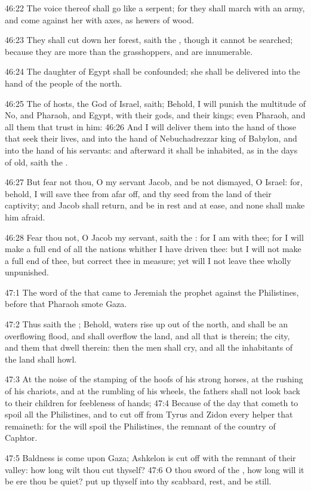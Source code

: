 46:22 The voice thereof shall go like a serpent; for they shall march with an army, and come against her with axes, as hewers of wood.

46:23 They shall cut down her forest, saith the \LORD, though it cannot be searched; because they are more than the grasshoppers, and are innumerable.

46:24 The daughter of Egypt shall be confounded; she shall be delivered into the hand of the people of the north.

46:25 The \LORD of hosts, the God of Israel, saith; Behold, I will punish the multitude of No, and Pharaoh, and Egypt, with their gods, and their kings; even Pharaoh, and all them that trust in him: 46:26 And I will deliver them into the hand of those that seek their lives, and into the hand of Nebuchadrezzar king of Babylon, and into the hand of his servants: and afterward it shall be inhabited, as in the days of old, saith the \LORD.

46:27 But fear not thou, O my servant Jacob, and be not dismayed, O Israel: for, behold, I will save thee from afar off, and thy seed from the land of their captivity; and Jacob shall return, and be in rest and at ease, and none shall make him afraid.

46:28 Fear thou not, O Jacob my servant, saith the \LORD: for I am with thee; for I will make a full end of all the nations whither I have driven thee: but I will not make a full end of thee, but correct thee in measure; yet will I not leave thee wholly unpunished.

47:1 The word of the \LORD that came to Jeremiah the prophet against the Philistines, before that Pharaoh smote Gaza.

47:2 Thus saith the \LORD; Behold, waters rise up out of the north, and shall be an overflowing flood, and shall overflow the land, and all that is therein; the city, and them that dwell therein: then the men shall cry, and all the inhabitants of the land shall howl.

47:3 At the noise of the stamping of the hoofs of his strong horses, at the rushing of his chariots, and at the rumbling of his wheels, the fathers shall not look back to their children for feebleness of hands; 47:4 Because of the day that cometh to spoil all the Philistines, and to cut off from Tyrus and Zidon every helper that remaineth: for the \LORD will spoil the Philistines, the remnant of the country of Caphtor.

47:5 Baldness is come upon Gaza; Ashkelon is cut off with the remnant of their valley: how long wilt thou cut thyself?  47:6 O thou sword of the \LORD, how long will it be ere thou be quiet? put up thyself into thy scabbard, rest, and be still.

